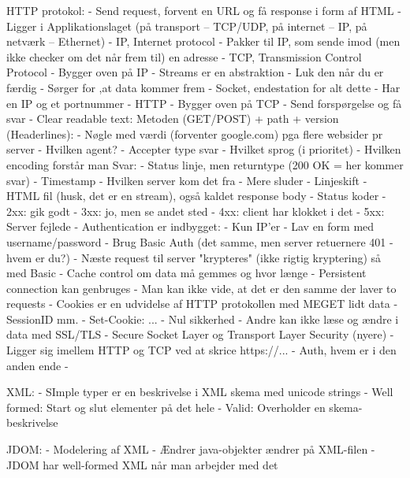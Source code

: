 HTTP protokol:
- Send request, forvent en URL og få response i form af HTML
- Ligger i Applikationslaget (på transport -- TCP/UDP, på internet -- IP, på netværk -- Ethernet)
	- IP, Internet protocol
		- Pakker til IP, som sende imod (men ikke checker om det når frem til) en adresse
	- TCP, Transmission Control Protocol
		- Bygger oven på IP
		- Streams er en abstraktion
			- Luk den når du er færdig
		- Sørger for ,at data kommer frem
		- Socket, endestation for alt dette
			- Har en IP og et portnummer
	- HTTP
		- Bygger oven på TCP
		- Send forspørgelse og få svar
		- Clear readable text:
			Metoden (GET/POST) + path + version
			(Headerlines): 
				- Nøgle med værdi (forventer google.com) pga flere websider pr server
				- Hvilken agent?
				- Accepter type svar
				- Hvilket sprog (i prioritet)
				- Hvilken encoding forstår man
			Svar:
				- Status linje, men returntype (200 OK = her kommer svar)
				- Timestamp
				- Hvilken server kom det fra
				- Mere sluder
				- Linjeskift
				- HTML fil (husk, det er en stream), også kaldet response body
		- Status koder
			- 2xx: gik godt
			- 3xx: jo, men se andet sted
			- 4xx: client har klokket i det
			- 5xx: Server fejlede
		- Authentication er indbygget:
			- Kun IP'er
			- Lav en form med username/password
			- Brug Basic Auth (det samme, men server retuernere 401 - hvem er du?)
				- Næste request til server "krypteres" (ikke rigtig kryptering) så med Basic
		- Cache control om data må gemmes og hvor længe
		- Persistent connection kan genbruges
		- Man kan ikke vide, at det er den samme der laver to requests
		- Cookies er en udvidelse af HTTP protokollen med MEGET lidt data
			- SessionID mm.
				- Set-Cookie: ...
		- Nul sikkerhed
			- Andre kan ikke læse og ændre i data med SSL/TLS
				- Secure Socket Layer og Transport Layer Security (nyere)
				- Ligger sig imellem HTTP og TCP ved at skrice https://...
			- Auth, hvem er i den anden ende
			- 




XML:
- SImple typer er en beskrivelse i XML skema med unicode strings
- Well formed: Start og slut elementer på det hele
- Valid: Overholder en skema-beskrivelse


JDOM:
- Modelering af XML
- Ændrer java-objekter ændrer på XML-filen
- JDOM har well-formed XML når man arbejder med det